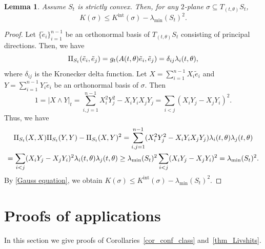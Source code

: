 \documentclass[JEP,XML,SOM,Unicode,NoFloatCountersInSection]{cedram}
\newcommand{\Int}{\mathrm{int}}
\newtheorem{lemma}[theorem]{Lemma}
\theoremstyle{definition}
\newcommand{\RomanNumeralCaps}[1]
{\MakeUppercase{\romannumeral #1}}
\newcommand{\II}{\textup{\RomanNumeralCaps{2}}}
\renewcommand{\>}{{\rangle}}
\newcommand{\<}{{\langle}}
\begin{document}
\begin{lemma}\label{lem: bound_level_curv}
Assume $S_t$ is strictly convex. Then, for any $2$-plane $\sigma\subseteq T_{(t,\theta)}S_t$,
\[
K(\sigma)\leq K^{\Int}(\sigma)-\lambda_{\min}(S_t)^2.
\]
\end{lemma}
\begin{proof}
Let $\{\tilde{e}_i\}_{i=1}^{n-1}$ be an orthonormal basis of $T_{(t,\theta)}S_t$ consisting of principal direc\-tions. Then, we have
\[
\II_{S_t}(\tilde{e}_i, \tilde{e}_j)=g_t(A(t,\theta)\tilde{e}_i, \tilde{e}_j)=\delta_{ij}\lambda_i(t,\theta),
\]
where $\delta_{ij}$ is the Kronecker delta function. Let $X=\sum_{i=1}^{n-1} X_i\tilde{e}_i$ and $Y=\sum_{i=1}^{n-1} Y_i\tilde{e}_i$ be an orthonormal basis of $\sigma$. Then\vspace*{-3pt}
\[
1=|X\wedge Y|_{t}=\sum_{i,j=1}^{n-1}X_i^2 Y_j^2-X_i Y_i X_j Y_j=\sum_{i<j}(X_i Y_j-X_jY_i)^2.
\]
Thus, we have\vspace*{-3pt}
\begin{multline*}
\II_{S_t}(X, X)\II_{S_t}(Y, Y)-\II_{S_t}(X, Y)^2=\sum_{i,j=1}^{n-1}(X_i^2 Y_j^2-X_i Y_i X_j Y_j)\lambda_i(t,\theta)\lambda_j(t,\theta)\\
= \sum_{i<j}(X_i Y_j-X_jY_i)^2\lambda_i(t,\theta)\lambda_j(t,\theta) \geq \lambda_{\min}(S_t)^2\sum_{i<j} (X_i Y_j-X_jY_i)^2=\lambda_{\min}(S_t)^2.
\end{multline*}
By \eqref{Gauss equation}, we obtain $K(\sigma)\leq K^{\Int}(\sigma)-\lambda_{\min}(S_t)^2.$
\end{proof}

\section{Proofs of applications}\label{sec: proof_corollaries}

In this section we give proofs of Corollaries~\ref{cor_conf_class} and~\ref{thm_Livshits}.
\end{document}
